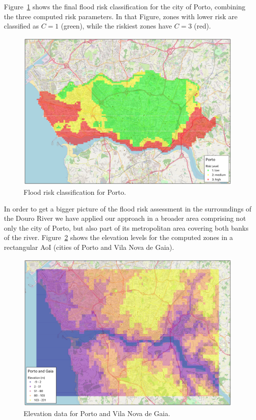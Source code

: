 \begin{refsection}
Figure~\ref{fig:porto} shows the final flood risk classification for the city of Porto, combining the three computed risk parameters. In that Figure, zones with lower risk are classified as $C=1$ (green), while the riskiest zones have $C=3$ (red).

\begin{figure}[h!]
    \centering
    \includegraphics[width=0.85\linewidth]{Chapters/6-Flood/figs/porto.pdf}
    \caption{Flood risk classification for Porto.}
    \label{fig:porto}
\end{figure}

In order to get a bigger picture of the flood risk assessment in the surroundings of the Douro River we have applied our approach in a broader area comprising not only the city of Porto, but also part of its metropolitan area covering both banks of the river. Figure~\ref{fig:porto_gaia_elevation} shows the elevation levels for the computed zones in a rectangular AoI (cities of Porto and Vila Nova de Gaia).

\begin{figure}[h]
    \centering
    \includegraphics[width=0.85\linewidth]{Chapters/6-Flood/figs/porto_gaia_elevation.pdf}
    \caption{Elevation data for Porto and Vila Nova de Gaia.}
    \label{fig:porto_gaia_elevation}
\end{figure}


\end{refsection}

